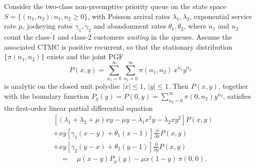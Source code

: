 \begin{lemma}\label{lem:gen:fundamental_equation}
Consider the two-class non-preemptive priority queue on the state space
$S=\{(n_1,n_2):n_1,n_2\ge 0\}$, with Poisson arrival rates $\lambda_1,\lambda_2$,
exponential service rate $\mu$, jockeying rates $\gamma_1,\gamma_2$ and abandonment
rates $\theta_1,\theta_2$, where $n_1$ and $n_2$ count the class-$1$ and class-$2$
customers \emph{waiting} in the queues. Assume the associated CTMC is positive
recurrent, so that the stationary distribution $\{\pi(n_1,n_2)\}$ exists and the
joint PGF
\[
    P(x,y)=\sum_{n_1=0}^{\infty}\sum_{n_2=0}^{\infty}\pi(n_1,n_2)\,x^{n_1}y^{n_2}
\]
is analytic on the closed unit polydisc $|x|\le 1,\ |y|\le 1$. Then $P(x,y)$,
together with the boundary function $P_y(y)=P(0,y)=\sum_{n_2=0}^{\infty}\pi(0,n_2)y^{n_2}$,
satisfies the first-order linear partial differential equation
\begin{equation}
\begin{split}
    & \left[ (\lambda_1+\lambda_2+\mu)xy - \mu y - \lambda_1 x^2 y - \lambda_2 x y^2 \right] P(x,y) \\
    & + xy \left[ \gamma_1(x-y) + \theta_1(x-1) \right] \frac{\partial}{\partial x} P(x,y) \\
    & + xy \left[ \gamma_2(y-x) + \theta_2(y-1) \right] \frac{\partial}{\partial y} P(x,y) \\
    & \quad = \quad \mu(x-y) P_y(y) - \mu x(1-y)\,\pi(0,0).
\end{split}
\label{eq:gen:fundamental_equation}
\end{equation}
\end{lemma}

